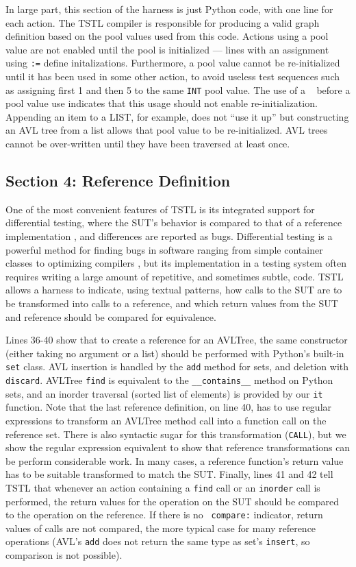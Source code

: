 \documentclass{sig-alternate}
\begin{document}
In large part, this section of the harness is just Python
code, with one line for each action.  The TSTL compiler is responsible
for producing a valid graph definition based on the pool values used
from this code.  Actions using a pool value are not enabled until the
pool is initialized --- lines with an assignment using {\tt :=} define
initalizations.  Furthermore, a pool value cannot be re-initialized
until it has been used in some other action, to avoid useless test
sequences such as assigning first 1 and then 5 to the same {\tt INT}
pool value.  The use of a ~ before a pool value use indicates that
this usage should not enable re-initialization.  Appending an item to
a LIST, for example, does not ``use it up'' but constructing an AVL
tree from a list allows that pool value to be re-initialized.  AVL
trees cannot be over-written until they have been traversed at least
once.


\subsection{Section 4: Reference Definition}

One of the most convenient features of TSTL is its integrated support
for differential testing, where the SUT's behavior is compared to that
of a reference implementation \cite{Differential,ICSEDiff}, and
differences are reported as bugs.  Differential testing is a powerful
method for finding bugs in software ranging from simple container
classes to optimizing compilers \cite{CSmith}, but its implementation
in a testing system often requires writing a large amount of
repetitive, and sometimes subtle, code.  TSTL allows a harness to
indicate, using textual patterns, how calls to the SUT are to be
transformed into calls to a reference, and which return values from
the SUT and reference should be compared for equivalence.

Lines 36-40 show that to create a reference for an AVLTree, the same
constructor (either taking no argument or a list) should be performed
with Python's built-in {\tt set} class.  AVL insertion is handled by
the {\tt add} method for sets, and deletion with {\tt discard}.
AVLTree  {\tt find} is equivalent to the {\tt \_\_contains\_\_} method
on Python sets, and an inorder traversal (sorted list of elements) is
provided by our {\tt it} function.  Note that the last reference
definition, on line 40, has to use regular expressions to transform an
AVLTree method call into a function call on the reference set.  There
is also syntactic sugar for this transformation ({\tt CALL}), but we
show the regular expression equivalent to show that reference
transformations can be perform considerable work.  In many cases, a
reference function's return value has to be suitable transformed to
match the SUT.  Finally, lines 41 and 42 tell TSTL that whenever an
action containing a {\tt find} call or an {\tt inorder} call is
performed, the return values for the operation on the SUT should be
compared to the operation on the reference.  If there is no {\tt
  compare:} indicator, return values of calls are not compared, the
more typical case for many reference operations (AVL's
{\tt add} does not return the same type as set's {\tt insert}, so
comparison is not possible).
\end{document}
